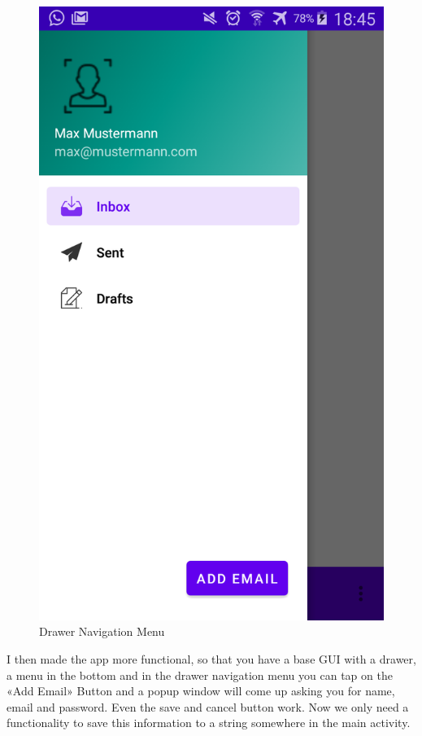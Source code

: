 \begin{figure}
\centering
\includegraphics[scale=.15]{media/drawer}
\caption{Drawer Navigation Menu}
\end{figure}
I then made the app more functional, so that you have a base GUI with a drawer, a menu in the bottom and in the drawer navigation menu you can tap on the «Add Email» Button and a popup window will come up asking you for name, email and password. Even the save and cancel button work. Now we only need a functionality to save this information to a string somewhere in the main activity.\\

